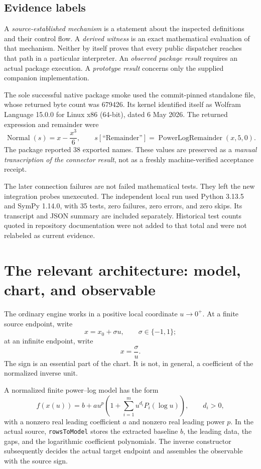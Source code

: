 \documentclass[11pt,letterpaper]{article}
\newcommand{\code}[1]{\nolinkurl{#1}}
\begin{document}
\subsection{Evidence labels}
A \emph{source-established mechanism} is a statement about the inspected definitions and their control flow. A \emph{derived witness} is an exact mathematical evaluation of that mechanism. Neither by itself proves that every public dispatcher reaches that path in a particular interpreter. An \emph{observed package result} requires an actual package execution. A \emph{prototype result} concerns only the supplied companion implementation.

The sole successful native package smoke used the commit-pinned standalone file, whose returned byte count was 679426. Its kernel identified itself as Wolfram Language 15.0.0 for Linux x86 (64-bit), dated 6 May 2026. The returned expression and remainder were
\[
 \operatorname{Normal}(s)=x-\frac{x^3}{6},\qquad
 s[\text{``Remainder''}]=\operatorname{PowerLogRemainder}(x,5,0).
\]
The package reported 38 exported names. These values are preserved as a \emph{manual transcription of the connector result}, not as a freshly machine-verified acceptance receipt.

The later connection failures are not failed mathematical tests. They left the new integration probes unexecuted. The independent local run used Python 3.13.5 and SymPy 1.14.0, with 35 tests, zero failures, zero errors, and zero skips. Its transcript and JSON summary are included separately. Historical test counts quoted in repository documentation were not added to that total and were not relabeled as current evidence.\cite{validation}

\section{The relevant architecture: model, chart, and observable}
\label{sec:architecture}

The ordinary engine works in a positive local coordinate \(u\to0^+\). At a finite source endpoint, write
\[
 x=x_0+\sigma u,\qquad \sigma\in\{-1,1\};
\]
at an infinite endpoint, write
\[
 x=\frac{\sigma}{u}.
\]
The sign is an essential part of the chart. It is not, in general, a coefficient of the normalized inverse unit.

A normalized finite power--log model has the form
\begin{equation}
 f(x(u))=b+a u^p\left(1+\sum_{i=1}^{m}u^{d_i}P_i(\log u)\right),
 \qquad d_i>0,
 \label{eq:model}
\end{equation}
with a nonzero real leading coefficient \(a\) and nonzero real leading power \(p\). In the actual source, \code{rowsToModel} stores the extracted baseline \(b\), the leading data, the gaps, and the logarithmic coefficient polynomials. The inverse constructor subsequently decides the actual target endpoint and assembles the observable with the source sign.\cite{core}
\end{document}
